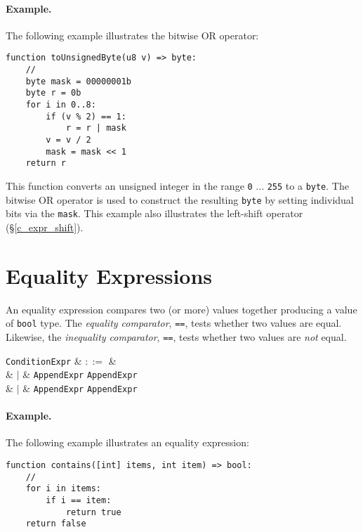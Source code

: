 \paragraph{Example.}  The following example illustrates the bitwise OR operator:

\begin{lstlisting}
function toUnsignedByte(u8 v) => byte:
    //
    byte mask = 00000001b
    byte r = 0b
    for i in 0..8:
        if (v % 2) == 1:
            r = r | mask
        v = v / 2
        mask = mask << 1
    return r  
\end{lstlisting}

This function converts an unsigned integer in the range \lstinline{0} ... \lstinline{255} to a \lstinline{byte}.  The bitwise OR operator is used to construct the resulting \lstinline{byte} by setting individual bits via the \lstinline{mask}.  This example also illustrates the left-shift operator (\S\ref{c_expr_shift}).


\section{Equality Expressions}
\label{c_expr_equality}
An equality expression compares two (or more) values together producing a value of \lstinline{bool} type.  The {\em equality comparator}, \lstinline{==}, tests whether two values are equal.  Likewise, the {\em inequality comparator}, \lstinline{==}, tests whether two values are {\em not} equal.

\begin{syntax}
  \verb+ConditionExpr+ & $::=$ &\\
  & $|$ & \verb+AppendExpr+ \token{==} \verb+AppendExpr+\\
  & $|$ & \verb+AppendExpr+ \token{!=} \verb+AppendExpr+\\
\end{syntax}

\paragraph{Example.}

The following example illustrates an equality expression:

\begin{lstlisting}
function contains([int] items, int item) => bool:
    //
    for i in items:
        if i == item:
            return true
    return false
\end{lstlisting}

